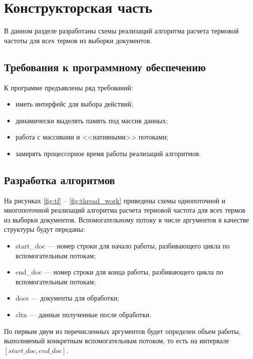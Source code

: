 \chapter{Конструкторская часть}

В данном разделе разработаны схемы реализаций алгоритма расчета термовой частоты для всех термов из выборки документов.

\section{Требования к программному обеспечению}

К программе предъявлены ряд требований:

\begin{itemize}[label=---]
	\item иметь интерфейс для выбора действий;
	\item динамически выделять память под массив данных;
	\item работа с массивами и <<нативными>> потоками;
	\item замерять процессорное время работы реализаций алгоритмов.
\end{itemize}

\section{Разработка алгоритмов}

На рисунках \ref{fig:tf} -- \ref{fig:thread_work} приведены схемы однопоточной и многопоточной реализаций алгоритма расчета термовой частота для всех термов из выборки документов.
Вспомогательному потоку в числе аргументов в качестве структуры будут переданы:
\begin{itemize}
	\item start\_doc --- номер строки для начало работы, разбивающего цикла по вспомогательным потокам;
	\item end\_doc  --- номер строки для конца работы, разбивающего цикла по вспомогательным потокам;
	\item docs --- документы для обработки;  
	\item cltn --- данные полученные после обработки.
\end{itemize}
По первым двум из перечисленных аргументов будет определен объем работы, выполняемый конкретным вспомогательным потоком, то есть на интервале $[start\_doc, end\_doc]$.

